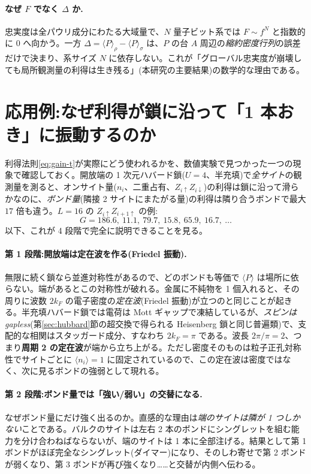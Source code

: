 \documentclass[11pt,a4paper]{ltjsarticle}
\newcommand{\ev}[1]{\langle #1\rangle}
\begin{document}
\paragraph{なぜ $F$ でなく $\Delta$ か.}忠実度は全パウリ成分にわたる大域量で、$N$ 量子ビット系では $F\sim f^N$ と指数的に $0$ へ向かう。一方 $\Delta=\ev{P}_\rho-\ev{P}_\sigma$ は、$P$ の台 $A$ 周辺の\emph{縮約密度行列}の誤差だけで決まり、系サイズ $N$ に依存しない。これが「グローバル忠実度が崩壊しても局所観測量の利得は生き残る」(本研究の主要結果)の数学的な理由である。

\section{応用例:なぜ利得が鎖に沿って「1 本おき」に振動するのか}
\label{sec:friedel}

利得法則\eqref{eq:gain-t}が実際にどう使われるかを、数値実験で見つかった一つの現象で確認しておく。開放端の 1 次元ハバード鎖($U=4$、半充填)で\emph{全サイト}の観測量を測ると、オンサイト量($n_i$、二重占有、$Z_{i\uparrow}Z_{i\downarrow}$)の利得は鎖に沿って滑らかなのに、\emph{ボンド量}(隣接 2 サイトにまたがる量)の利得は隣り合うボンドで最大 $17$ 倍も違う。$L=16$ の $Z_{i\uparrow}Z_{i+1\uparrow}$ の例:
\[
  G = 186.6,\ 11.1,\ 79.7,\ 15.8,\ 65.9,\ 16.7,\ \dots
\]
以下、これが 4 段階で完全に説明できることを見る。

\paragraph{第 1 段階:開放端は定在波を作る(Friedel 振動).}
無限に続く鎖なら並進対称性があるので、どのボンドも等価で $\ev{P}$ は場所に依らない。端があるとこの対称性が破れる。金属に不純物を 1 個入れると、その周りに波数 $2k_F$ の電子密度の\emph{定在波}(Friedel 振動)が立つのと同じことが起きる。半充填ハバード鎖では電荷は Mott ギャップで凍結しているが、\emph{スピンは gapless}(第\ref{sec:hubbard}節の超交換で得られる Heisenberg 鎖と同じ普遍類)で、支配的な相関はスタッガード成分、すなわち $2k_F=\pi$ である。波長 $2\pi/\pi=2$、つまり\textbf{周期 2 の定在波}が端から立ち上がる。ただし密度そのものは粒子正孔対称性でサイトごとに $\ev{n_i}=1$ に固定されているので、この定在波は密度ではなく、次に見るボンドの強弱として現れる。

\paragraph{第 2 段階:ボンド量では「強い/弱い」の交替になる.}
なぜボンド量にだけ強く出るのか。直感的な理由は\emph{端のサイトは隣が 1 つしかない}ことである。バルクのサイトは左右 2 本のボンドにシングレットを組む能力を分け合わねばならないが、端のサイトは 1 本に全部注げる。結果として第 1 ボンドがほぼ完全なシングレット(ダイマー)になり、そのしわ寄せで第 2 ボンドが弱くなり、第 3 ボンドが再び強くなり……と交替が内側へ伝わる。
\end{document}
